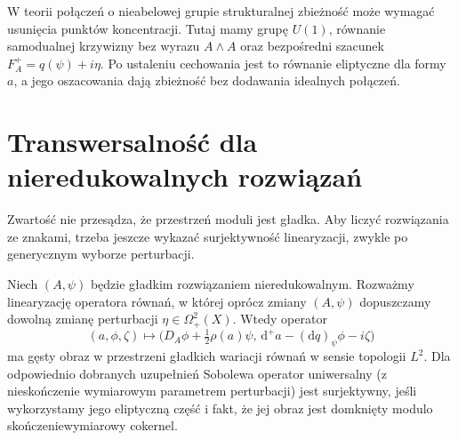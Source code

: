 \begin{uwaga}
W teorii połączeń o nieabelowej grupie strukturalnej
zbieżność może wymagać usunięcia punktów koncentracji.
Tutaj mamy grupę $U(1)$, równanie samodualnej krzywizny
bez wyrazu $A\wedge A$ oraz bezpośredni szacunek
$F_A^+=q(\psi)+i\eta$. Po ustaleniu cechowania jest to
równanie eliptyczne dla formy $a$, a jego oszacowania
dają zbieżność bez dodawania idealnych połączeń.
\end{uwaga}

\section{Transwersalność dla nieredukowalnych rozwiązań}
\label{sec:tg-sw12-transversality}

Zwartość nie przesądza, że przestrzeń moduli jest gładka.
Aby liczyć rozwiązania ze znakami, trzeba jeszcze wykazać
surjektywność linearyzacji, zwykle po generycznym wyborze
perturbacji.

\begin{lemat}
\label{lem:tg-sw12-surj}
Niech $(A,\psi)$ będzie gładkim rozwiązaniem nieredukowalnym.
Rozważmy linearyzację operatora równań, w której oprócz
zmiany $(A,\psi)$ dopuszczamy dowolną zmianę perturbacji
$\eta\in\Omega^2_+(X)$. Wtedy operator
\[
(a,\phi,\zeta)\longmapsto
\bigl(D_A\phi+\tfrac12\rho(a)\psi,\,
\mathrm d^+a-(\mathrm dq)_\psi\phi-i\zeta\bigr)
\]
ma gęsty obraz w przestrzeni gładkich wariacji równań
w sensie topologii $L^2$. Dla odpowiednio dobranych
uzupełnień Sobolewa operator uniwersalny (z nieskończenie
wymiarowym parametrem perturbacji) jest surjektywny,
jeśli wykorzystamy jego eliptyczną część i fakt, że
jej obraz jest domknięty modulo skończeniewymiarowy cokernel.
\end{lemat}

